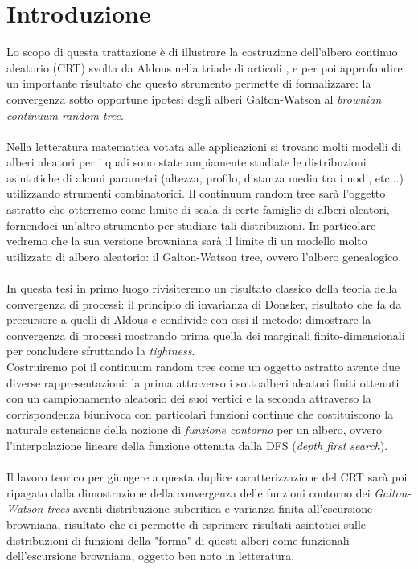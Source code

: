 \documentclass[11pt, twoside]{report}
\theoremstyle{definition}
\theoremstyle{plain}
\theoremstyle{remark}
\numberwithin{equation}{chapter}
\begin{document}
\chapter{Introduzione}
Lo scopo di questa trattazione è di illustrare la costruzione dell'albero continuo aleatorio (CRT) svolta da Aldous nella triade di articoli \cite{Ald1},\cite{Ald2} e \cite{Ald3} per poi approfondire un importante risultato che questo strumento permette di formalizzare: la convergenza sotto opportune ipotesi degli alberi Galton-Watson al \textit{brownian continuum random tree}.\\
\\
Nella letteratura matematica votata alle applicazioni si trovano molti modelli di alberi aleatori per i quali sono state ampiamente studiate le distribuzioni asintotiche di alcuni parametri (altezza, profilo, distanza media tra i nodi, etc...) utilizzando strumenti combinatorici.
Il continuum random tree sarà l'oggetto astratto che otterremo come limite di scala di certe famiglie di alberi aleatori, fornendoci un'altro strumento per studiare tali distribuzioni. In particolare vedremo che la sua versione browniana sarà il limite di un modello molto utilizzato di albero aleatorio: il Galton-Watson tree, ovvero l'albero genealogico.\\
\\
In questa tesi in primo luogo rivisiteremo un risultato classico della teoria della convergenza di processi: il principio di invarianza di Donsker, risultato che fa da precursore a quelli di Aldous e condivide con essi il metodo: dimostrare la convergenza di processi mostrando prima quella dei marginali finito-dimensionali per concludere sfruttando la \textit{tightness}.\\
Costruiremo poi il continuum random tree come un oggetto astratto avente due diverse rappresentazioni: la prima attraverso i sottoalberi aleatori finiti ottenuti con un campionamento aleatorio dei suoi vertici e la seconda attraverso la corrispondenza biunivoca con particolari funzioni continue che costituiscono la naturale estensione della nozione di \textit{funzione contorno} per un albero, ovvero l'interpolazione lineare della funzione ottenuta dalla DFS (\textit{depth first search}).\\
\\
Il lavoro teorico per giungere a questa duplice caratterizzazione del CRT sarà poi ripagato dalla dimostrazione della convergenza delle funzioni contorno dei \textit{Galton-Watson trees} aventi distribuzione subcritica e varianza finita all'escursione browniana, risultato che ci permette di esprimere risultati asintotici sulle distribuzioni di funzioni della "forma" di questi alberi come funzionali dell'escursione browniana, oggetto ben noto in letteratura.
\end{document}
